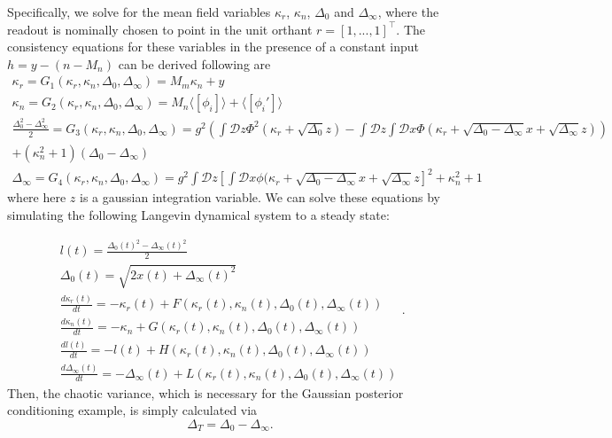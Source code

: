 \documentclass[11pt]{article}
\begin{document}
Specifically, we solve for the mean field variables $\kappa_r$, $\kappa_n$, $\Delta_0$ and $\Delta_\infty$, where the readout is nominally chosen to point in the unit orthant $r = [1, ..., 1]^\top$.  The consistency equations for these variables in the presence of a constant input $h = y - (n - M_n)$ can be derived following \cite{mastrogiuseppe2018linking} are
{\small
\begin{equation}
\begin{split}
\kappa_r = G_1(\kappa_r, \kappa_n, \Delta_0, \Delta_\infty) = M_m \kappa_n + y \\
\kappa_n = G_2(\kappa_r, \kappa_n, \Delta_0, \Delta_\infty) = M_n \langle \left[ \phi_i \right] \rangle + \langle \left[ \phi_i' \right] \rangle \\
\frac{\Delta_0^2-\Delta_\infty^2}{2} = G_3(\kappa_r, \kappa_n, \Delta_0, \Delta_\infty) = g^2 \left( \int \mathcal{D}z \Phi^2(\kappa_r + \sqrt{\Delta_0}z) - \int \mathcal{D}z \int \mathcal{D}x \Phi(\kappa_r + \sqrt{\Delta_0 - \Delta_\infty}x + \sqrt{\Delta_\infty}z)  \right) \\
+ (\kappa_n^2  + 1)(\Delta_0-\Delta_\infty) \\
\Delta_\infty = G_4(\kappa_r, \kappa_n, \Delta_0, \Delta_\infty)  = g^2 \int \mathcal{D}z \left[ \int \mathcal{D}x \phi(\kappa_r + \sqrt{\Delta_0 - \Delta_\infty}x + \sqrt{\Delta_\infty}z \right]^2 + \kappa_n^2 + 1
\end{split} 
\end{equation}
}
where here $z$ is a gaussian integration variable. We can solve these equations by simulating the following Langevin dynamical system to a steady state:

\begin{equation}
\begin{split}
l(t) = \frac{\Delta_0(t)^2-\Delta_\infty(t)^2}{2} \\
\Delta_0(t) = \sqrt{2x(t) + \Delta_\infty(t)^2} \\
\frac{d \kappa_r(t)}{dt}  = -\kappa_r(t) + F(\kappa_r(t), \kappa_n(t), \Delta_0(t), \Delta_\infty(t)) \\
\frac{d \kappa_n(t)}{dt} = -\kappa_n + G(\kappa_r(t), \kappa_n(t), \Delta_0(t), \Delta_\infty(t)) \\
\frac{d l(t)}{dt}  = -l(t) + H(\kappa_r(t), \kappa_n(t), \Delta_0(t), \Delta_\infty(t)) \\
\frac{d \Delta_\infty(t)}{dt}  = -\Delta_\infty(t) + L(\kappa_r(t), \kappa_n(t), \Delta_0(t), \Delta_\infty(t))
\end{split}.
\end{equation}
Then, the chaotic variance, which is necessary for the Gaussian posterior conditioning example, is simply calculated via
\begin{equation}
\Delta_T = \Delta_0 - \Delta_\infty.
\end{equation}
\end{document}
